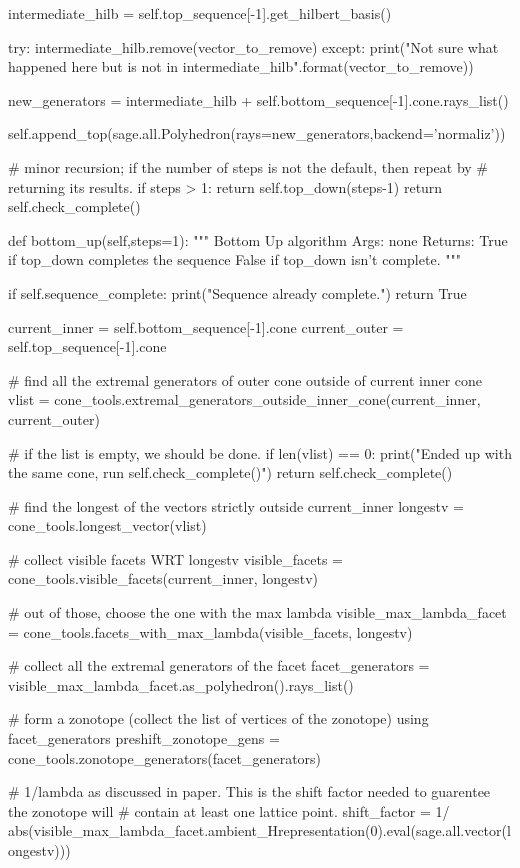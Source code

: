\documentclass{TC}
\begin{document}
\begin{SAGE}
		intermediate_hilb = self.top_sequence[-1].get_hilbert_basis()
		
		try:
			intermediate_hilb.remove(vector_to_remove)
		except:
			print("Not sure what happened here but {} is not in intermediate_hilb".format(vector_to_remove))

		new_generators = intermediate_hilb + self.bottom_sequence[-1].cone.rays_list()
		
		self.append_top(sage.all.Polyhedron(rays=new_generators,backend='normaliz'))
		
		# minor recursion; if the number of steps is not the default, then repeat by
		# returning its results.
		if steps > 1:
			return self.top_down(steps-1)
		return self.check_complete()

	def bottom_up(self,steps=1):
		""" Bottom Up algorithm
		Args: none
		Returns: True if top_down completes the sequence
				 False if top_down isn't complete. 
		"""
			
		if self.sequence_complete:
			print("Sequence already complete.")
			return True

		current_inner = self.bottom_sequence[-1].cone
		current_outer = self.top_sequence[-1].cone

		# find all the extremal generators of outer cone outside of current inner cone
		vlist = cone_tools.extremal_generators_outside_inner_cone(current_inner, current_outer)

		# if the list is empty, we should be done.
		if len(vlist) == 0:
			print("Ended up with the same cone, run self.check_complete()")
			return self.check_complete()
		
		# find the longest of the vectors strictly outside current_inner
		longestv = cone_tools.longest_vector(vlist)

		# collect visible facets WRT longestv
		visible_facets = cone_tools.visible_facets(current_inner, longestv)
		
		# out of those, choose the one with the max lambda
		visible_max_lambda_facet = cone_tools.facets_with_max_lambda(visible_facets, longestv)
		
		# collect all the extremal generators of the facet
		facet_generators =  visible_max_lambda_facet.as_polyhedron().rays_list()

		# form a zonotope (collect the list of vertices of the zonotope) using facet_generators
		preshift_zonotope_gens = cone_tools.zonotope_generators(facet_generators)

		# 1/lambda as discussed in paper. This is the shift factor needed to guarentee the zonotope will
		# contain at least one lattice point.
		shift_factor = 1/ abs(visible_max_lambda_facet.ambient_Hrepresentation(0).eval(sage.all.vector(longestv)))


\end{SAGE}
\end{document}
